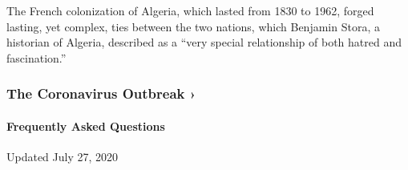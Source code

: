 The French colonization of Algeria, which lasted from 1830 to 1962,
forged lasting, yet complex, ties between the two nations, which
Benjamin Stora, a historian of Algeria, described as a ``very special
relationship of both hatred and fascination.''

\href{https://www.nytimes.com/news-event/coronavirus?action=click\&pgtype=Article\&state=default\&region=MAIN_CONTENT_3\&context=storylines_faq}{}

\hypertarget{the-coronavirus-outbreak-}{%
\subsubsection{The Coronavirus Outbreak
›}\label{the-coronavirus-outbreak-}}

\hypertarget{frequently-asked-questions}{%
\paragraph{Frequently Asked
Questions}\label{frequently-asked-questions}}

Updated July 27, 2020

